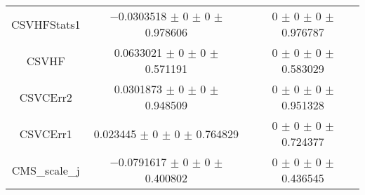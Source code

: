\begin{table}
\begin{tabular}{ccc}
CSVHFStats1 & \num{-0.0303518} $\pm$ \num{0} $\pm$ \num{0} $\pm$ \num{0.978606} & \num{0} $\pm$ \num{0} $\pm$ \num{0} $\pm$ \num{0.976787}\\
CSVHF & \num{0.0633021} $\pm$ \num{0} $\pm$ \num{0} $\pm$ \num{0.571191} & \num{0} $\pm$ \num{0} $\pm$ \num{0} $\pm$ \num{0.583029}\\
CSVCErr2 & \num{0.0301873} $\pm$ \num{0} $\pm$ \num{0} $\pm$ \num{0.948509} & \num{0} $\pm$ \num{0} $\pm$ \num{0} $\pm$ \num{0.951328}\\
CSVCErr1 & \num{0.023445} $\pm$ \num{0} $\pm$ \num{0} $\pm$ \num{0.764829} & \num{0} $\pm$ \num{0} $\pm$ \num{0} $\pm$ \num{0.724377}\\
CMS\_scale\_j & \num{-0.0791617} $\pm$ \num{0} $\pm$ \num{0} $\pm$ \num{0.400802} & \num{0} $\pm$ \num{0} $\pm$ \num{0} $\pm$ \num{0.436545}\\
\bottomrule
\end{tabular}
\end{table}